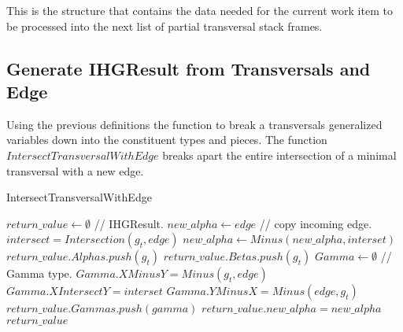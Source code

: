This is the structure that contains the data needed for the current work item to be processed into the next list of partial transversal stack frames. 

\newpage
\subsection{Generate IHGResult from Transversals and Edge}
Using the previous definitions the function to break a transversals generalized variables down into the constituent types and pieces. The function $IntersectTransversalWithEdge$ breaks apart the entire intersection of a minimal transversal with a new edge. 



\begin{algorithm}
	\caption{IntersectTransversalWithEdge}\label{IntersectTransversalWithEdge}
	\begin{algorithmic}[1]
		\State $return\_value \gets \emptyset$ // IHGResult.
		\State $new\_alpha \gets edge$ // copy incoming edge.
		\State $intersect = Intersection(g_t,edge)$
		\State $new\_alpha \gets Minus(new\_alpha,interset)$
		\State $return\_value.Alphas.push(g_t)$
		\Else
		\State $return\_value.Betas.push(g_t)$		
		\Else
		\State $Gamma \gets \emptyset$ // Gamma type.
		\State $Gamma.XMinusY = Minus(g_t,edge)$
		\State $Gamma.XIntersectY = interset$
		\State $Gamma.YMinusX = Minus(edge,g_t)$
		\State $return\_value.Gammas.push(gamma)$
		\EndIf
		\EndIf
		\EndFor
		\State $return\_value.new\_alpha = new\_alpha$
		\State \Return $return\_value$
		\EndFunction
	\end{algorithmic}
\end{algorithm}



\newpage
